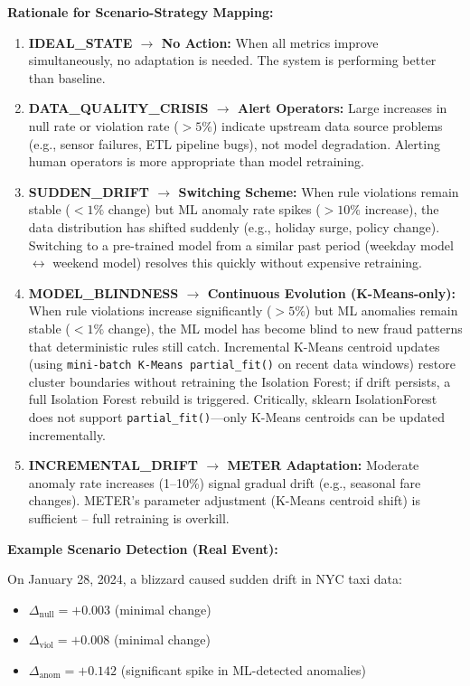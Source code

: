 \textbf{Rationale for Scenario-Strategy Mapping:}

\begin{enumerate}
    \item \textbf{IDEAL\_STATE $\to$ No Action:} When all metrics improve simultaneously, no adaptation is needed. The system is performing better than baseline.

    \item \textbf{DATA\_QUALITY\_CRISIS $\to$ Alert Operators:} Large increases in null rate or violation rate (${>}5\%$) indicate upstream data source problems (e.g., sensor failures, ETL pipeline bugs), not model degradation. Alerting human operators is more appropriate than model retraining.

    \item \textbf{SUDDEN\_DRIFT $\to$ Switching Scheme:} When rule violations remain stable (${<}1\%$ change) but ML anomaly rate spikes (${>}10\%$ increase), the data distribution has shifted suddenly (e.g., holiday surge, policy change). Switching to a pre-trained model from a similar past period (weekday model $\leftrightarrow$ weekend model) resolves this quickly without expensive retraining.

    \item \textbf{MODEL\_BLINDNESS $\to$ Continuous Evolution (K-Means-only):} When rule violations increase significantly (${>}5\%$) but ML anomalies remain stable (${<}1\%$ change), the ML model has become blind to new fraud patterns that deterministic rules still catch. Incremental K-Means centroid updates (using \texttt{mini-batch K-Means partial\_fit()} on recent data windows) restore cluster boundaries without retraining the Isolation Forest; if drift persists, a full Isolation Forest rebuild is triggered. Critically, sklearn IsolationForest does not support \texttt{partial\_fit()}---only K-Means centroids can be updated incrementally.

    \item \textbf{INCREMENTAL\_DRIFT $\to$ METER Adaptation:} Moderate anomaly rate increases (1--10\%) signal gradual drift (e.g., seasonal fare changes). METER's parameter adjustment (K-Means centroid shift) is sufficient -- full retraining is overkill.
\end{enumerate}

\textbf{Example Scenario Detection (Real Event):}

On January 28, 2024, a blizzard caused sudden drift in NYC taxi data:
\begin{itemize}
    \item $\Delta_{\text{null}} = +0.003$ (minimal change)
    \item $\Delta_{\text{viol}} = +0.008$ (minimal change)
    \item $\Delta_{\text{anom}} = +0.142$ (significant spike in ML-detected anomalies)
\end{itemize}

